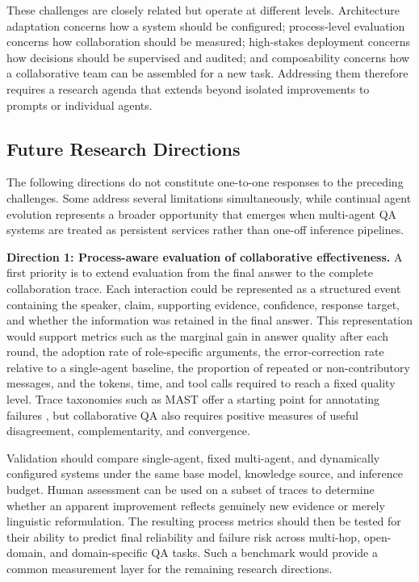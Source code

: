 These challenges are closely related but operate at different levels.
Architecture adaptation concerns how a system should be configured;
process-level evaluation concerns how collaboration should be measured;
high-stakes deployment concerns how decisions should be supervised and
audited; and composability concerns how a collaborative team can be assembled
for a new task. Addressing them therefore requires a research agenda that
extends beyond isolated improvements to prompts or individual agents.

\subsection{Future Research Directions}
\label{sec:future_directions}

The following directions do not constitute one-to-one responses to the
preceding challenges. Some address several limitations simultaneously, while
continual agent evolution represents a broader opportunity that emerges when
multi-agent QA systems are treated as persistent services rather than
one-off inference pipelines.

\textbf{Direction 1: Process-aware evaluation of collaborative
effectiveness.}
A first priority is to extend evaluation from the final answer to the complete
collaboration trace. Each interaction could be represented as a structured
event containing the speaker, claim, supporting evidence, confidence,
response target, and whether the information was retained in the final
answer. This representation would support metrics such as the marginal gain
in answer quality after each round, the adoption rate of role-specific
arguments, the error-correction rate relative to a single-agent baseline, the
proportion of repeated or non-contributory messages, and the tokens, time, and
tool calls required to reach a fixed quality level. Trace taxonomies such as
MAST offer a starting point for annotating failures \citep{han2024mast}, but
collaborative QA also requires positive measures of useful disagreement,
complementarity, and convergence.

Validation should compare single-agent, fixed multi-agent, and dynamically
configured systems under the same base model, knowledge source, and inference
budget. Human assessment can be used on a subset of traces to determine
whether an apparent improvement reflects genuinely new evidence or merely
linguistic reformulation. The resulting process metrics should then be tested
for their ability to predict final reliability and failure risk across
multi-hop, open-domain, and domain-specific QA tasks. Such a benchmark would
provide a common measurement layer for the remaining research directions.

